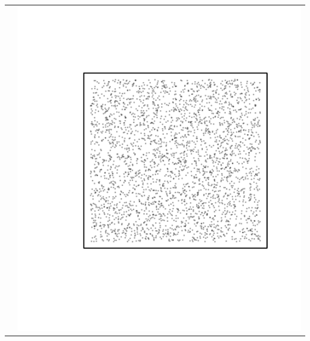 \documentclass{article}\usepackage{graphicx, color}
\makeatletter
\def\maxwidth{ %
  \ifdim\Gin@nat@width>\linewidth
    \linewidth
  \else
    \Gin@nat@width
  \fi
}
\newenvironment{knitrout}{}{} %
\makeatother
\begin{document}
\begin{tabular}{cc}
&
\begin{knitrout}
\definecolor{shadecolor}{rgb}{0.969, 0.969, 0.969}\color{fgcolor}\includegraphics[width=\maxwidth]{figure/unnamed-chunk-14} 
\end{knitrout}

\\
\end{tabular}
\end{document}
